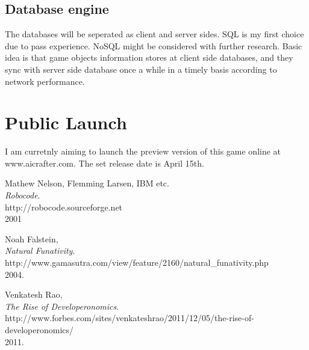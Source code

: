 \documentclass[12pt]{article}
\begin{document}
\subsection{Database engine}
The databases will be seperated as client and server sides. SQL is my first choice due to pass experience. NoSQL might be considered with further research. Basic idea is that game objects information stores at client side databases, and they sync with server side database once a while in a timely basis according to network performance.

\section{Public Launch}
I am curretnly aiming to launch the preview version of this game online at www.aicrafter.com. The set release date is April 15th. 

\begin{thebibliography}{9}

	Mathew Nelson, Flemming Larsen, IBM etc.\\
	\emph{Robocode}.\\
	http://robocode.sourceforge.net\\
	2001

	Noah Falstein,\\
	\emph{Natural Funativity}.\\
	http://www.gamasutra.com/view/feature/2160/natural\_funativity.php\\
	2004.

	Venkatesh Rao,\\
	\emph{The Rise of Developeronomics}.\\
	http://www.forbes.com/sites/venkateshrao/2011/12/05/the-rise-of-developeronomics/\\
	2011.

\end{thebibliography}

	
\end{document}
